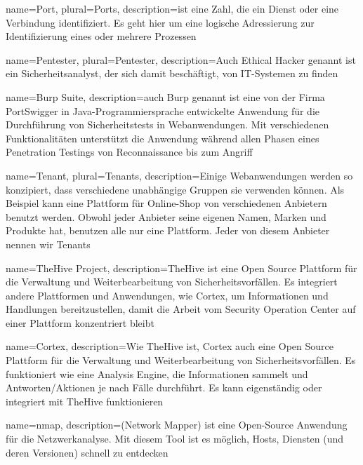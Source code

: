  {
    name={Port},
    plural={Ports},
    description={ist eine Zahl, die ein Dienst oder eine Verbindung identifiziert. Es geht hier um eine logische Adressierung zur Identifizierung eines oder mehrere Prozessen \citep{porttanenbaum}}
}

 {
    name={Pentester},
    plural={Pentester},
    description={Auch Ethical Hacker genannt ist ein Sicherheitsanalyst, der sich damit beschäftigt,   von IT-Systemen zu finden \citep{pentester}}   
}

 {
    name={Burp Suite},
    description={auch Burp genannt ist eine von der Firma PortSwigger in Java-Programmiersprache entwickelte Anwendung für die Durchführung von Sicherheitstests in Webanwendungen. Mit verschiedenen Funktionalitäten unterstützt die Anwendung während allen Phasen eines Penetration Testings von Reconnaissance bis zum Angriff \citep{burp}}   
}

 {
    name={Tenant},
    plural={Tenants},
    description={Einige Webanwendungen werden so konzipiert, dass verschiedene unabhängige Gruppen sie verwenden können. Als Beispiel kann eine Plattform für Online-Shop von verschiedenen Anbietern benutzt werden. Obwohl jeder Anbieter seine eigenen Namen, Marken und Produkte hat, benutzen alle nur eine Plattform. Jeder von diesem Anbieter nennen wir Tenants}   
}

 {
    name={TheHive Project},
    description={TheHive ist eine Open Source Plattform für die Verwaltung und Weiterbearbeitung von Sicherheitsvorfällen. Es integriert andere Plattformen und Anwendungen, wie Cortex, um Informationen und Handlungen bereitzustellen, damit die Arbeit vom Security Operation Center auf einer Plattform konzentriert bleibt \citep{TheHive}}   
}

 {
    name={Cortex},
    description={Wie \gls{TheHive} ist, Cortex auch eine Open Source Plattform für die Verwaltung und Weiterbearbeitung von Sicherheitsvorfällen. Es funktioniert wie eine Analysis Engine, die Informationen sammelt und Antworten/Aktionen je nach Fälle durchführt. Es kann eigenständig oder integriert mit TheHive funktionieren \citep{TheHive}}   
}

 {
    name={nmap},
    description={(Network Mapper) ist eine Open-Source Anwendung für die Netzwerkanalyse. Mit diesem Tool ist es möglich, Hosts, Diensten (und deren Versionen) schnell
    zu entdecken \citep{nmap}}    
}

